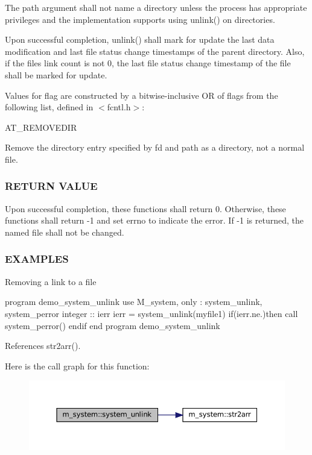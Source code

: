 The path argument shall not name a directory unless the process has appropriate privileges and the implementation supports using unlink() on directories.

Upon successful completion, unlink() shall mark for update the last data modification and last file status change timestamps of the parent directory. Also, if the file\textquotesingle{}s link count is not 0, the last file status change timestamp of the file shall be marked for update.

Values for flag are constructed by a bitwise-\/inclusive OR of flags from the following list, defined in $<$fcntl.\+h$>$\+:

A\+T\+\_\+\+R\+E\+M\+O\+V\+E\+D\+IR

Remove the directory entry specified by fd and path as a directory, not a normal file.

\subsubsection*{R\+E\+T\+U\+RN V\+A\+L\+UE}

\begin{DoxyVerb}Upon successful completion, these functions shall return 0. Otherwise,
these functions shall return -1 and set errno to indicate the error. If
-1 is returned, the named file shall not be changed.
\end{DoxyVerb}


\subsubsection*{E\+X\+A\+M\+P\+L\+ES}

Removing a link to a file

program demo\+\_\+system\+\_\+unlink use M\+\_\+system, only \+: system\+\_\+unlink, system\+\_\+perror integer \+:\+: ierr ierr = system\+\_\+unlink(\textquotesingle{}myfile1\textquotesingle{}) if(ierr.\+ne.)then call system\+\_\+perror(\textquotesingle{}) endif end program demo\+\_\+system\+\_\+unlink 

References str2arr().

Here is the call graph for this function\+:
\nopagebreak
\begin{figure}[H]
\begin{center}
\leavevmode
\includegraphics[width=350pt]{namespacem__system_a14ce0b9177815bc357dbdf3778687bb7_cgraph}
\end{center}
\end{figure}
\mbox{\label{namespacem__system_a61b67b46b35490ec308773b65c3376a3}} 
